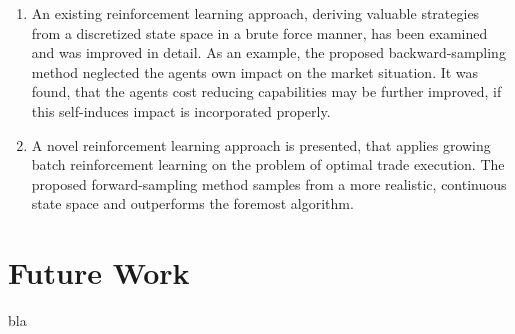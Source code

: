 \begin{enumerate}
\item An existing reinforcement learning approach, deriving valuable strategies from a discretized state space in a brute force manner, has been examined and was improved in detail. As an example, the proposed backward-sampling method neglected the agents own impact on the market situation. It was found, that the agents cost reducing capabilities may be further improved, if this self-induces impact is incorporated properly.

\item A novel reinforcement learning approach is presented, that applies growing batch reinforcement learning on the problem of optimal trade execution. The proposed forward-sampling method samples from a more realistic, continuous state space and outperforms the foremost algorithm.

\end{enumerate}

\section{Future Work}
bla